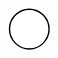 \documentclass[10pt]{article}
\theoremstyle{plain}
\theoremstyle{remark}
\begin{document}
\[\begin{pgfpicture}
\begin{pgfscope}
\pgfpathlineto{\pgfqpoint{1.697138in}{3.558832in}}%
\pgfpathlineto{\pgfqpoint{1.597139in}{3.559393in}}%
\pgfpathclose%
\pgfusepath{stroke,fill}%
\end{pgfscope}%
\begin{pgfscope}%
\pgfsetbuttcap%
\pgfsetroundjoin%
\definecolor{currentfill}{rgb}{1.000000,1.000000,1.000000}%
\pgfsetfillcolor{currentfill}%
\pgfsetlinewidth{1.003750pt}%
\definecolor{currentstroke}{rgb}{0.000000,0.000000,0.000000}%
\pgfsetstrokecolor{currentstroke}%
\pgfsetdash{}{0pt}%
\pgfpathmoveto{\pgfqpoint{0.296419in}{3.715385in}}%
\pgfpathcurveto{\pgfqpoint{0.348509in}{3.715385in}}{\pgfqpoint{0.398474in}{3.736081in}}{\pgfqpoint{0.435307in}{3.772914in}}%
\pgfpathcurveto{\pgfqpoint{0.472141in}{3.809748in}}{\pgfqpoint{0.492837in}{3.859712in}}{\pgfqpoint{0.492837in}{3.911803in}}%
\pgfpathcurveto{\pgfqpoint{0.492837in}{3.963894in}}{\pgfqpoint{0.472141in}{4.013858in}}{\pgfqpoint{0.435307in}{4.050692in}}%
\pgfpathcurveto{\pgfqpoint{0.398474in}{4.087526in}}{\pgfqpoint{0.348509in}{4.108222in}}{\pgfqpoint{0.296419in}{4.108222in}}%
\pgfpathcurveto{\pgfqpoint{0.244328in}{4.108222in}}{\pgfqpoint{0.194363in}{4.087526in}}{\pgfqpoint{0.157530in}{4.050692in}}%
\pgfpathcurveto{\pgfqpoint{0.120696in}{4.013858in}}{\pgfqpoint{0.100000in}{3.963894in}}{\pgfqpoint{0.100000in}{3.911803in}}%
\pgfpathcurveto{\pgfqpoint{0.100000in}{3.859712in}}{\pgfqpoint{0.120696in}{3.809748in}}{\pgfqpoint{0.157530in}{3.772914in}}%
\pgfpathcurveto{\pgfqpoint{0.194363in}{3.736081in}}{\pgfqpoint{0.244328in}{3.715385in}}{\pgfqpoint{0.296419in}{3.715385in}}%
\pgfpathclose%
\pgfusepath{stroke,fill}%
\end{pgfscope}%
\begin{pgfscope}%
\pgfsetbuttcap%
\pgfsetroundjoin%
\definecolor{currentfill}{rgb}{1.000000,1.000000,1.000000}%
\pgfsetfillcolor{currentfill}%
\pgfsetlinewidth{1.003750pt}%
\definecolor{currentstroke}{rgb}{0.000000,0.000000,0.000000}%
\pgfsetstrokecolor{currentstroke}%
\pgfsetdash{}{0pt}%
\pgfpathmoveto{\pgfqpoint{1.629153in}{0.100000in}}%
\pgfpathcurveto{\pgfqpoint{1.681244in}{0.100000in}}{\pgfqpoint{1.731208in}{0.120696in}}{\pgfqpoint{1.768042in}{0.157530in}}%
\pgfpathcurveto{\pgfqpoint{1.804875in}{0.194363in}}{\pgfqpoint{1.825571in}{0.244328in}}{\pgfqpoint{1.825571in}{0.296419in}}%
\pgfpathcurveto{\pgfqpoint{1.825571in}{0.348509in}}{\pgfqpoint{1.804875in}{0.398474in}}{\pgfqpoint{1.768042in}{0.435307in}}%
\pgfpathcurveto{\pgfqpoint{1.731208in}{0.472141in}}{\pgfqpoint{1.681244in}{0.492837in}}{\pgfqpoint{1.629153in}{0.492837in}}%
\pgfpathcurveto{\pgfqpoint{1.577062in}{0.492837in}}{\pgfqpoint{1.527098in}{0.472141in}}{\pgfqpoint{1.490264in}{0.435307in}}%

\end{pgfscope}
\end{pgfpicture}\]
\end{document}
